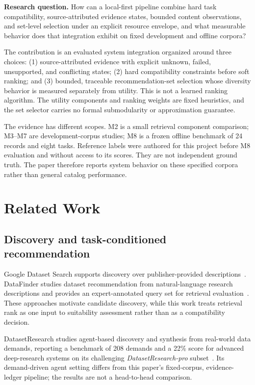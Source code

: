 \documentclass[conference]{IEEEtran}
\begin{document}
\textbf{Research question.} How can a local-first pipeline combine hard task compatibility, source-attributed evidence states, bounded content observations, and set-level selection under an explicit resource envelope, and what measurable behavior does that integration exhibit on fixed development and offline corpora?

The contribution is an evaluated system integration organized around three choices: (1) source-attributed evidence with explicit unknown, failed, unsupported, and conflicting states; (2) hard compatibility constraints before soft ranking; and (3) bounded, traceable recommendation-set selection whose diversity behavior is measured separately from utility. This is not a learned ranking algorithm. The utility components and ranking weights are fixed heuristics, and the set selector carries no formal submodularity or approximation guarantee.

The evidence has different scopes. M2 is a small retrieval component comparison; M3--M7 are development-corpus studies; M8 is a frozen offline benchmark of 24 records and eight tasks. Reference labels were authored for this project before M8 evaluation and without access to its scores. They are not independent ground truth. The paper therefore reports system behavior on these specified corpora rather than general catalog performance.

\section{Related Work}
\subsection{Discovery and task-conditioned recommendation}
Google Dataset Search supports discovery over publisher-provided descriptions~\cite{noy2019googledatasetsearch}. DataFinder studies dataset recommendation from natural-language research descriptions and provides an expert-annotated query set for retrieval evaluation~\cite{viswanathan2023datafinder}. These approaches motivate candidate discovery, while this work treats retrieval rank as one input to suitability assessment rather than as a compatibility decision.

DatasetResearch studies agent-based discovery and synthesis from real-world data demands, reporting a benchmark of 208 demands and a 22\% score for advanced deep-research systems on its challenging \emph{DatasetResearch-pro} subset~\cite{li2025datasetresearch}. Its demand-driven agent setting differs from this paper's fixed-corpus, evidence-ledger pipeline; the results are not a head-to-head comparison.
\end{document}
